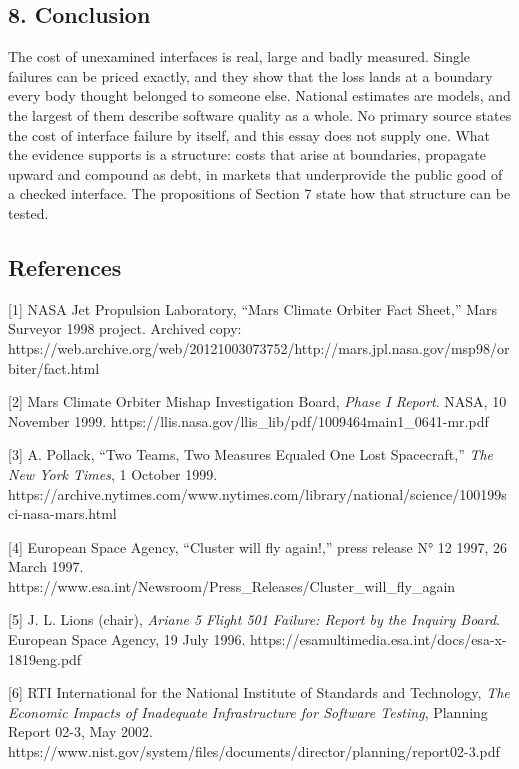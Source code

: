 \documentclass[
  10pt,
]{article}
\begin{document}
\subsection{8. Conclusion}\label{conclusion}

The cost of unexamined interfaces is real, large and badly measured.
Single failures can be priced exactly, and they show that the loss lands
at a boundary every body thought belonged to someone else. National
estimates are models, and the largest of them describe software quality
as a whole. No primary source states the cost of interface failure by
itself, and this essay does not supply one. What the evidence supports
is a structure: costs that arise at boundaries, propagate upward and
compound as debt, in markets that underprovide the public good of a
checked interface. The propositions of Section 7 state how that
structure can be tested.

\subsection{References}\label{references}

{[}1{]} NASA Jet Propulsion Laboratory, ``Mars Climate Orbiter Fact
Sheet,'' Mars Surveyor 1998 project. Archived copy:
https://web.archive.org/web/20121003073752/http://mars.jpl.nasa.gov/msp98/orbiter/fact.html

{[}2{]} Mars Climate Orbiter Mishap Investigation Board, \emph{Phase I
Report}. NASA, 10 November 1999.
https://llis.nasa.gov/llis\_lib/pdf/1009464main1\_0641-mr.pdf

{[}3{]} A. Pollack, ``Two Teams, Two Measures Equaled One Lost
Spacecraft,'' \emph{The New York Times}, 1 October 1999.
https://archive.nytimes.com/www.nytimes.com/library/national/science/100199sci-nasa-mars.html

{[}4{]} European Space Agency, ``Cluster will fly again!,'' press
release N° 12 1997, 26 March 1997.
https://www.esa.int/Newsroom/Press\_Releases/Cluster\_will\_fly\_again

{[}5{]} J. L. Lions (chair), \emph{Ariane 5 Flight 501 Failure: Report
by the Inquiry Board}. European Space Agency, 19 July 1996.
https://esamultimedia.esa.int/docs/esa-x-1819eng.pdf

{[}6{]} RTI International for the National Institute of Standards and
Technology, \emph{The Economic Impacts of Inadequate Infrastructure for
Software Testing}, Planning Report 02-3, May 2002.
https://www.nist.gov/system/files/documents/director/planning/report02-3.pdf
\end{document}
